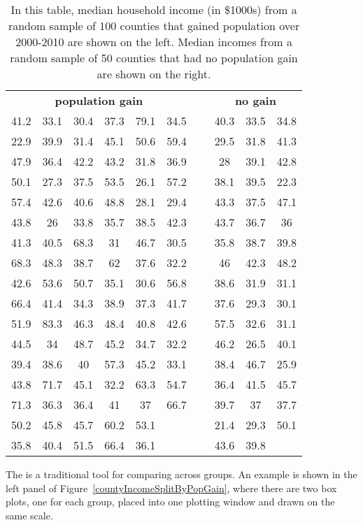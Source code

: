 \begin{table}
\centering
\begin{tabular}{ ccc ccc c ccc }
\multicolumn{6}{c}{\bf population gain} && \multicolumn{3}{c}{\bf no gain} \\
  \cline{1-6} \cline{8-10}
41.2 & 33.1 & 30.4 & 37.3 & 79.1 & 34.5 &\hspace{5mm}\ & 40.3 & 33.5 & 34.8 \\
22.9 & 39.9 & 31.4 & 45.1 & 50.6 & 59.4 && 29.5 & 31.8 & 41.3 \\
47.9 & 36.4 & 42.2 & 43.2 & 31.8 & 36.9 && 28 & 39.1 & 42.8 \\
50.1 & 27.3 & 37.5 & 53.5 & 26.1 & 57.2 && 38.1 & 39.5 & 22.3 \\
57.4 & 42.6 & 40.6 & 48.8 & 28.1 & 29.4 && 43.3 & 37.5 & 47.1 \\
43.8 & 26 & 33.8 & 35.7 & 38.5 & 42.3 && 43.7 & 36.7 & 36 \\
41.3 & 40.5 & 68.3 & 31 & 46.7 & 30.5 && 35.8 & 38.7 & 39.8 \\
68.3 & 48.3 & 38.7 & 62 & 37.6 & 32.2 && 46 & 42.3 & 48.2 \\
42.6 & 53.6 & 50.7 & 35.1 & 30.6 & 56.8 && 38.6 & 31.9 & 31.1 \\
66.4 & 41.4 & 34.3 & 38.9 & 37.3 & 41.7 && 37.6 & 29.3 & 30.1 \\
51.9 & 83.3 & 46.3 & 48.4 & 40.8 & 42.6 && 57.5 & 32.6 & 31.1 \\
44.5 & 34 & 48.7 & 45.2 & 34.7 & 32.2 && 46.2 & 26.5 & 40.1 \\
39.4 & 38.6 & 40 & 57.3 & 45.2 & 33.1 && 38.4 & 46.7 & 25.9 \\
43.8 & 71.7 & 45.1 & 32.2 & 63.3 & 54.7 && 36.4 & 41.5 & 45.7 \\
71.3 & 36.3 & 36.4 & 41 & 37 & 66.7 && 39.7 & 37 & 37.7 \\
50.2 & 45.8 & 45.7 & 60.2 & 53.1 &  && 21.4 & 29.3 & 50.1 \\
35.8 & 40.4 & 51.5 & 66.4 & 36.1 &  && 43.6 & 39.8 &  \\
\cline{1-6} \cline{8-10}
\end{tabular}
\caption{In this table, median household income (in \$1000s) from a random sample of 100 counties that gained population over 2000-2010 are shown on the left. Median incomes from a random sample of 50 counties that had no population gain are shown on the right.}
\label{countyIncomeSplitByPopGainTable}
\end{table}

The   is a traditional tool for comparing across groups. An example is shown in the left panel of Figure~\ref{countyIncomeSplitByPopGain}, where there are two box plots, one for each group, placed into one plotting window and drawn on the same scale.

